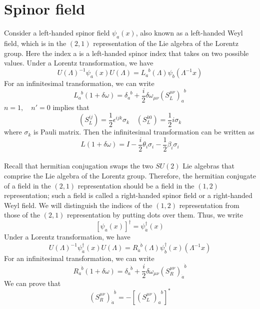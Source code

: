 \section{Spinor field}
Consider a left-handed spinor field $\psi_a(x)$, also known as a left-handed Weyl field, which is in the $(2,1)$ representation of the Lie algebra of the Lorentz group. Here the index a is a left-handed spinor index that takes on two possible values. Under a Lorentz transformation, we have
\[U(\Lambda)^{-1} \psi_a(x) U(\Lambda) = L_a^{\phantom{a}b}(\Lambda) \psi_b(\Lambda^{-1}x)\]
For an infinitesimal transformation, we can write
\[L_a^{\phantom{a}b}(1+\delta \omega) = \delta_a^{\phantom{a}b} + \frac{i}{2} \delta \omega_{\mu \nu} (S_L^{\mu \nu})_a^{\phantom{a}b}\]
$n=1, \quad n'=0$  implies that
\[(S_L^{i j}) = \frac{1}{2}\epsilon^{ijk}\sigma_k \quad  (S_L^{k 0}) = \frac{1}{2}i\sigma_k\]
where $\sigma_k$ is Pauli matrix.
Then the infinitesimal transformation can be written as
\[L(1+\delta \omega) = I - \frac{i}{2} \theta_i \sigma_i -\frac{1}{2} \beta_i \sigma_i\]
\\
Recall that hermitian conjugation swaps the two $SU(2)$ Lie
algebras that comprise the Lie algebra of the Lorentz group.
Therefore, the hermitian conjugate of a field in the $(2,1)$ representation should be a field in the $(1,2)$ representation; such a field is called a right-handed spinor field or a right-handed Weyl field. We will distinguish the indices of the $(1,2)$ representation from those of the $(2,1)$ representation by putting dots over them. Thus, we write
\[[\psi_a(x)]^{\dagger} = \psi^{\dagger}_{\dot{a}}(x)\]
Under a Lorentz transformation, we have
\[U(\Lambda)^{-1} \psi^{\dagger}_{\dot{a}}(x) U(\Lambda) = R_{\dot{a}}^{\phantom{a}\dot{b}}(\Lambda) \psi^{\dagger}_{\dot{b}}(x)(\Lambda^{-1}x)\]
For an infinitesimal transformation, we can write
\[R_{\dot{a}}^{\phantom{a}\dot{b}}(1+\delta \omega) = \delta_{\dot{a}}^{\phantom{a}\dot{b}} + \frac{i}{2} \delta \omega_{\mu \nu} (S_R^{\mu \nu})_{\dot{a}}^{\phantom{a}\dot{b}}\]
We can prove that
\[(S_R^{\mu \nu})_{\dot{a}}^{\phantom{a}\dot{b}} = -[(S_L^{\mu \nu})_a^{\phantom{a}b}]^*\]

